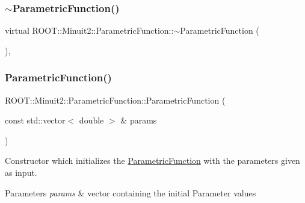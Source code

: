 \subsubsection{\texorpdfstring{$\sim$ParametricFunction()}{~ParametricFunction()}\hspace{0.1cm}{\footnotesize\ttfamily [1/2]}}
{\footnotesize\ttfamily virtual R\+O\+O\+T\+::\+Minuit2\+::\+Parametric\+Function\+::$\sim$\+Parametric\+Function (\begin{DoxyParamCaption}{ }\end{DoxyParamCaption})\hspace{0.3cm}{\ttfamily [inline]}, {\ttfamily [virtual]}}

\mbox{\label{classROOT_1_1Minuit2_1_1ParametricFunction_a5abce16504b1532a38da1409afdaa71d}} 
\subsubsection{\texorpdfstring{ParametricFunction()}{ParametricFunction()}\hspace{0.1cm}{\footnotesize\ttfamily [3/4]}}
{\footnotesize\ttfamily R\+O\+O\+T\+::\+Minuit2\+::\+Parametric\+Function\+::\+Parametric\+Function (\begin{DoxyParamCaption}\item[{const std\+::vector$<$ double $>$ \&}]{params }\end{DoxyParamCaption})\hspace{0.3cm}{\ttfamily [inline]}}

Constructor which initializes the \mbox{\hyperlink{classROOT_1_1Minuit2_1_1ParametricFunction}{Parametric\+Function}} with the parameters given as input.


\begin{DoxyParams}{Parameters}
{\em params} & vector containing the initial Parameter values \\
\hline
\end{DoxyParams}
\mbox{\label{classROOT_1_1Minuit2_1_1ParametricFunction_a0b8e823b3a61fc0f20ffe419e0fa1e1a}} 
